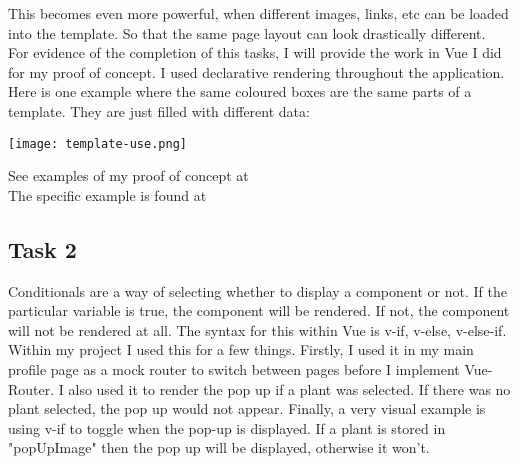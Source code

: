 \documentclass[portfolio.tex]{subfiles}
\begin{document}
				This becomes even more powerful, when different images, links, etc can be loaded into the template. So that the same page layout can look drastically different. \\

				For evidence of the completion of this tasks, I will provide the work in Vue I did for my proof of concept. I used declarative rendering throughout the application. Here is one example where the same coloured boxes are the same parts of a template. They are just filled with different data:\\

				\begin{center}
					\texttt{[image: template-use.png]}
				\end{center}



				See examples of my proof of concept at  \\

				The specific example is found at 

			\subsection{Task 2}
				Conditionals are a way of selecting whether to display a component or not. If the particular variable is true, the component will be rendered. If not, the component will not be rendered at all. The syntax for this within Vue is v-if, v-else, v-else-if. Within my project I used this for a few things. Firstly, I used it in my main profile page as a mock router to switch between pages before I implement Vue-Router. I also used it to render the pop up if a plant was selected. If there was no plant selected, the pop up would not appear. Finally, a very visual example is using v-if to toggle when the pop-up is displayed. If a plant is stored in "popUpImage" then the pop up will be displayed, otherwise it won't. \\

				\hspace{-0.8cm}
				\\
\end{document}
